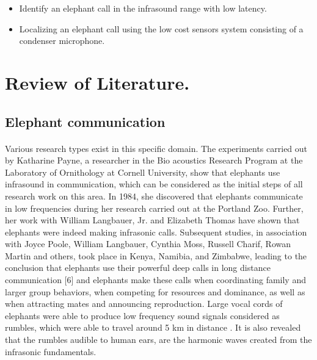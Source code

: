 \documentclass[12pt]{article}
\numberwithin{figure}{section}
\numberwithin{table}{section}
\begin{document}
\begin{flushleft}
\end{flushleft}

\begin{itemize}

\item 	Identify an elephant call in the infrasound range with low latency.
\item 	Localizing an elephant call using the low cost sensors system consisting of a condenser microphone.
\end{itemize}

\newpage
\section{Review of Literature.}
\subsection{Elephant communication}
\paragraph{}
Various research types exist in this specific domain. The experiments carried out by Katharine Payne, a researcher in the Bio acoustics Research Program at the Laboratory of Ornithology at Cornell University, show that elephants use infrasound in communication, which can be considered as the initial steps of all research work on this area. In 1984, she discovered that elephants communicate in low frequencies during her research carried out at the Portland Zoo. Further, her work with William Langbauer, Jr. and Elizabeth Thomas have shown that elephants were indeed making infrasonic calls. Subsequent studies, in association with Joyce Poole, William Langbauer, Cynthia Moss, Russell Charif, Rowan Martin and others, took place in Kenya, Namibia, and Zimbabwe, leading to the conclusion that elephants use their powerful deep calls in long distance communication [6] and elephants make these calls when coordinating family and larger group behaviors, when competing for resources and dominance, as well as when attracting mates and announcing reproduction. Large vocal cords of elephants were able to produce low frequency sound signals considered as rumbles, which were able to travel around 5 km in distance \cite {6}. It is also revealed that the rumbles audible to human ears, are the harmonic waves created from the infrasonic fundamentals.
\end{document}
